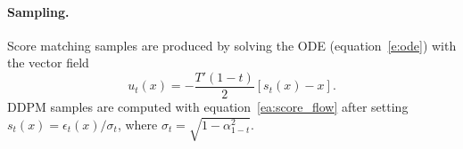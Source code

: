 \documentclass{article}
\newcommand{\norm}[1]{\left\Vert#1\right\Vert}
\newcommand{\brac}[1]{\left [#1\right ]}
\newcommand{\SM}{\scriptscriptstyle \text{SM}}
\def\eqref#1{equation~\ref{#1}}
\def\ra{{\textnormal{a}}}
\def\gL{{\mathcal{L}}}
\def\gN{{\mathcal{N}}}
\newcommand{\E}{\mathbb{E}}
\renewcommand{\ra}[1]{\renewcommand{\arraystretch}{#1}}
\newcommand{\tcen}[1]{\multicolumn{1}{c}{#1}}
\newcommand{\tnan}{\tcen{--}}
\begin{document}
{\paragraph{Sampling.} Score matching samples are produced by solving the ODE (\eqref{e:ode}) with the vector field
\begin{equation}\label{ea:score_flow}
    u_t(x) = -\frac{T'(1-t)}{2}\brac{s_t(x) - x}.
\end{equation} 
DDPM samples are computed with \eqref{ea:score_flow} after setting $s_t(x) = \epsilon_t(x)/\sigma_t$, where $\sigma_t = \sqrt{1-\alpha_{1-t}^2}$. 
}



\end{document}
